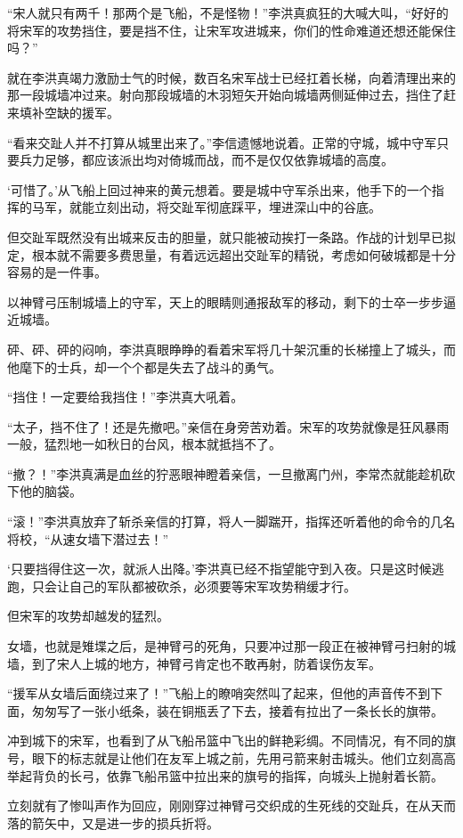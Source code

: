 “宋人就只有两千！那两个是飞船，不是怪物！”李洪真疯狂的大喊大叫，“好好的将宋军的攻势挡住，要是挡不住，让宋军攻进城来，你们的性命难道还想还能保住吗？”

就在李洪真竭力激励士气的时候，数百名宋军战士已经扛着长梯，向着清理出来的那一段城墙冲过来。射向那段城墙的木羽短矢开始向城墙两侧延伸过去，挡住了赶来填补空缺的援军。

“看来交趾人并不打算从城里出来了。”李信遗憾地说着。正常的守城，城中守军只要兵力足够，都应该派出均对倚城而战，而不是仅仅依靠城墙的高度。

‘可惜了。’从飞船上回过神来的黄元想着。要是城中守军杀出来，他手下的一个指挥的马军，就能立刻出动，将交趾军彻底踩平，埋进深山中的谷底。

但交趾军既然没有出城来反击的胆量，就只能被动挨打一条路。作战的计划早已拟定，根本就不需要多费思量，有着远远超出交趾军的精锐，考虑如何破城都是十分容易的是一件事。

以神臂弓压制城墙上的守军，天上的眼睛则通报敌军的移动，剩下的士卒一步步逼近城墙。

砰、砰、砰的闷响，李洪真眼睁睁的看着宋军将几十架沉重的长梯撞上了城头，而他麾下的士兵，却一个个都是失去了战斗的勇气。

“挡住！一定要给我挡住！”李洪真大吼着。

“太子，挡不住了！还是先撤吧。”亲信在身旁苦劝着。宋军的攻势就像是狂风暴雨一般，猛烈地一如秋日的台风，根本就抵挡不了。

“撤？！”李洪真满是血丝的狞恶眼神瞪着亲信，一旦撤离门州，李常杰就能趁机砍下他的脑袋。

“滚！”李洪真放弃了斩杀亲信的打算，将人一脚踹开，指挥还听着他的命令的几名将校，“从速女墙下潜过去！”

‘只要挡得住这一次，就派人出降。’李洪真已经不指望能守到入夜。只是这时候逃跑，只会让自己的军队都被砍杀，必须要等宋军攻势稍缓才行。

但宋军的攻势却越发的猛烈。

女墙，也就是雉堞之后，是神臂弓的死角，只要冲过那一段正在被神臂弓扫射的城墙，到了宋人上城的地方，神臂弓肯定也不敢再射，防着误伤友军。

“援军从女墙后面绕过来了！”飞船上的瞭哨突然叫了起来，但他的声音传不到下面，匆匆写了一张小纸条，装在铜瓶丢了下去，接着有拉出了一条长长的旗带。

冲到城下的宋军，也看到了从飞船吊篮中飞出的鲜艳彩绸。不同情况，有不同的旗号，眼下的标志就是让他们在友军上城之前，先用弓箭来射击城头。他们立刻高高举起背负的长弓，依靠飞船吊篮中拉出来的旗号的指挥，向城头上抛射着长箭。

立刻就有了惨叫声作为回应，刚刚穿过神臂弓交织成的生死线的交趾兵，在从天而落的箭矢中，又是进一步的损兵折将。

